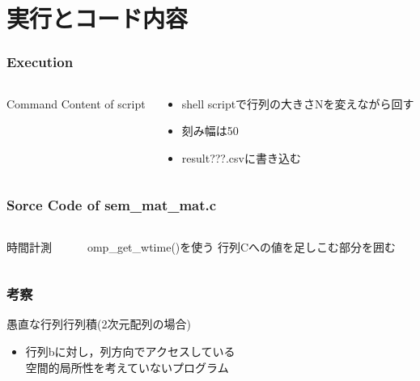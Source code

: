 \documentclass[dvipdfmx]{beamer}
\begin{document}

\section{実行とコード内容}
\begin{frame}
	\frametitle{Execution}
	\begin{columns}
	\begin{column}{0.60\textwidth}
	Command
	Content of script
	\end{column}
	\begin{column}{0.30\textwidth}
	\begin{itemize}
		\item shell scriptで行列の大きさNを変えながら回す\\
		\item 刻み幅は50\\
		\item result???.csvに書き込む
	\end{itemize}
	\end{column}
	\end{columns}
\end{frame}

\begin{frame}
	\frametitle{Sorce Code of sem\_mat\_mat.c}
	\begin{columns}
	\begin{column}{0.60\textwidth}
		時間計測
	\end{column}
	\begin{column}{0.30\textwidth}
		omp\_get\_wtime()を使う
		行列Cへの値を足しこむ部分を囲む
	\end{column}
	\end{columns}
\end{frame}


\begin{frame}
	\frametitle{考察}
	愚直な行列行列積(2次元配列の場合)
	\begin{itemize}
		\item 行列bに対し，列方向でアクセスしている\\ 空間的局所性を考えていないプログラム
	\end{itemize}
\end{frame}
\end{document}
